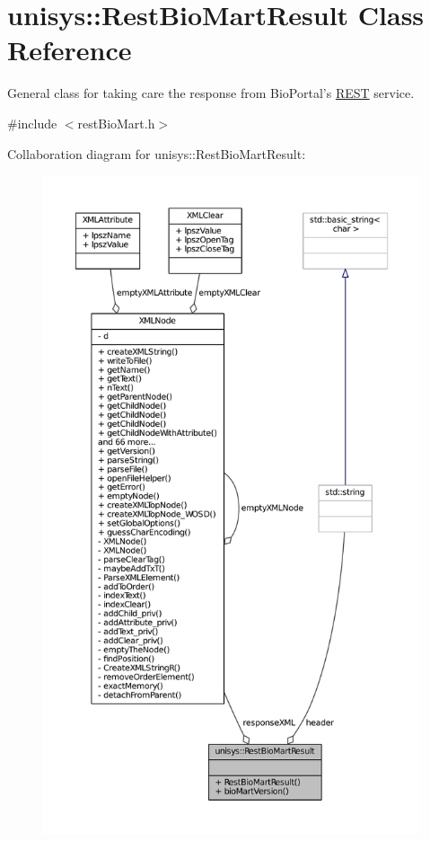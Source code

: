 \hypertarget{classunisys_1_1RestBioMartResult}{\section{unisys\-:\-:Rest\-Bio\-Mart\-Result Class Reference}
\label{classunisys_1_1RestBioMartResult}
}


General class for taking care the response from Bio\-Portal's \hyperlink{classunisys_1_1REST}{R\-E\-S\-T} service.  




{\ttfamily \#include $<$rest\-Bio\-Mart.\-h$>$}



Collaboration diagram for unisys\-:\-:Rest\-Bio\-Mart\-Result\-:
\nopagebreak
\begin{figure}[H]
\begin{center}
\leavevmode
\includegraphics[height=550pt]{classunisys_1_1RestBioMartResult__coll__graph}
\end{center}
\end{figure}
